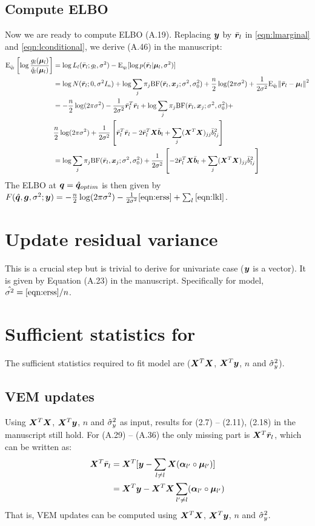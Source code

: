 \subsection{Compute ELBO}
Now we are ready to compute ELBO (A.19).
Replacing $\bm y$ by $\bar{\bm r}_l$ in \eqref{eqn:lmarginal} and \eqref{eqn:lconditional}, we derive (A.46) in the manuscript:
\begin{align}
    \text{E}_{\hat{q}_l} \left[ \log \frac{g_l(\bm \mu_l)}{\hat{q}_l(\bm \mu_l)} \right] &= \log L_l(\bar{\bm r}_l; g_l,\sigma^2) - \text{E}_{q_l}[\log p(\bar{\bm r}_l|\bm \mu_l,\sigma^2)]  \\
    &= \log N(\bar{\bm r}_l; 0, \sigma^2 I_n) + \log \sum_j \pi_j \text{BF}(\bar{\bm r}_l, \bm x_j; \sigma^2, \sigma^2_0) + \frac{n}{2} \log(2\pi\sigma^2) +\frac{1}{2\sigma^2}\text{E}_{\hat{q}_l}\norm{\bar{\bm r}_l-\bm \mu_l}^2 \\
    &= -\frac{n}{2} \log(2\pi\sigma^2) -\frac{1}{2\sigma^2}\bar{\bm r}_l^T\bar{\bm r}_l + \log \sum_j \pi_j \text{BF}(\bar{\bm r}_l, \bm x_j; \sigma^2, \sigma^2_0) + \\
    & \frac{n}{2} \log(2\pi\sigma^2) +\frac{1}{2\sigma^2}\left[\bar{\bm r}_l^T\bar{\bm r}_l - 2\bar{\bm r}_l^T\bm X \bar{\bm b}_l + \sum_j (\bm X^T \bm X)_{jj} \bar{b}_{lj}^2 \right] \\
    &= \log \sum_j \pi_j \text{BF}(\bar{\bm r}_l, \bm x_j; \sigma^2, \sigma^2_0) + \frac{1}{2\sigma^2}\left[- 2\bar{\bm r}_l^T\bm X \bar{\bm b}_l + \sum_j (\bm X^T \bm X)_{jj} \bar{b}_{lj}^2\right] \label{eqn:lkl}
\end{align}
The ELBO at ${\bm q} = \hat{{\bm q}}_{optim}$ is then given by $F(\hat{{\bm q}},\bm g,\sigma^2; \bm y) = -\frac{n}{2} \log(2\pi\sigma^2) - \frac{1}{2\sigma^2} \eqref{eqn:erss} + \sum_l \eqref{eqn:lkl}$.

\section{Update residual variance}
This is a crucial step but is trivial to derive for univariate case ($\bm y$ is a vector). It is given by Equation (A.23) in the manuscript. Specifically for \susie model, $\hat{\sigma^2} = \eqref{eqn:erss}/n$.

\section{Sufficient statistics for \susie}

The sufficient statistics required to fit \susie model are ($\bm X^T\bm X$, $\bm X^T\bm y$, $n$ and $\hat{\sigma}_y^2$).

\subsection{VEM updates} \label{sec:vem_update_ss}
Using $\bm X^T\bm X$, $\bm X^T\bm y$, $n$ and $\hat{\sigma}_y^2$ as input, results for (2.7) -- (2.11), (2.18) in the manuscript still hold. For (A.29) -- (A.36) the only missing part is $\bm X^T\bar{\bm r}_l$, which can be written as:
\begin{align}
\bm X^T\bar{\bm r}_l &= \bm X^T[\bm y - \sum_{l\neq l}\bm X (\bm \alpha_{l'} \circ \bm \mu_{l'})] \\
&= \bm X^T\bm y - \bm X^T\bm X\sum_{l'\neq l}(\bm \alpha_{l'} \circ \bm \mu_{l'})
\end{align}
That is, VEM updates can be computed using $\bm X^T\bm X$, $\bm X^T\bm y$, $n$ and $\hat{\sigma}_y^2$.


